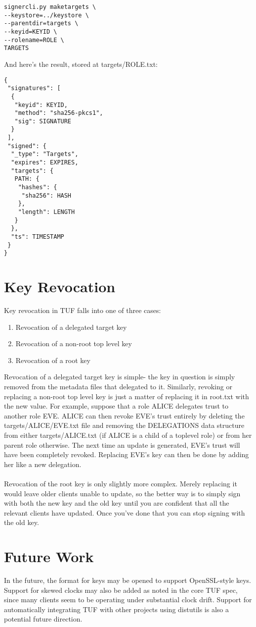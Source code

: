 \documentclass{article}
\begin{document}
\begin{lstlisting}
signercli.py maketargets \
--keystore=../keystore \
--parentdir=targets \
--keyid=KEYID \
--rolename=ROLE \
TARGETS
\end{lstlisting}

And here's the result, stored at targets/ROLE.txt:

\begin{verbatim}
{
 "signatures": [
  {
   "keyid": KEYID, 
   "method": "sha256-pkcs1", 
   "sig": SIGNATURE
  }
 ], 
 "signed": {
  "_type": "Targets", 
  "expires": EXPIRES, 
  "targets": {
   PATH: {
    "hashes": {
     "sha256": HASH
    }, 
    "length": LENGTH
   }
  }, 
  "ts": TIMESTAMP
 }
}
\end{verbatim}

\section{Key Revocation}
Key revocation in TUF falls into one of three cases:

\begin{enumerate}
        \item Revocation of a delegated target key
        \item Revocation of a non-root top level key
        \item Revocation of a root key
\end{enumerate}

Revocation of a delegated target key is simple- the key in question is simply
removed from the metadata files that delegated to it. Similarly, revoking or
replacing a non-root top level key is just a matter of replacing it in root.txt
with the new value. For example, suppose that a role ALICE delegates trust to
another role EVE. ALICE can then revoke EVE's trust entirely by deleting the
targets/ALICE/EVE.txt file and removing the DELEGATIONS data structure from
either targets/ALICE.txt (if ALICE is a child of a toplevel role) or from her
parent role otherwise. The next time an update is generated, EVE's trust will
have been completely revoked. Replacing EVE's key can then be done by adding her
like a new delegation.
\\\\
Revocation of the root key is only slightly more complex. Merely replacing it would 
leave older clients unable to update, so the better way is to simply sign with 
both the new key and the old key until you are confident that all the relevant clients 
have updated. Once you've done that you can stop signing with the old key. 

\section{Future Work}
In the future, the format for keys may be opened to support OpenSSL-style keys.
Support for skewed clocks may also be added as noted in the core TUF spec, since
many clients seem to be operating under substantial clock drift. Support for
automatically integrating TUF with other projects using distutils is also a
potential future direction.
\end{document}
